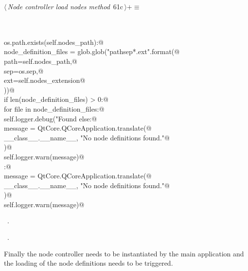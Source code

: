 \documentclass[
    a4paper,      %
    10pt,         %
    openright,    %
    notitlepage,  %
    parskip=half, %
]{scrreprt}       %
\theoremstyle{definition}                    %
\begin{document}
\begin{flushleft} \small
\begin{minipage}{\linewidth}\label{scrap105}\raggedright\small
{} $\langle\,${\itshape Node controller load nodes method}\nobreak\ {\footnotesize {61c}}$\,\rangle+\equiv$
\vspace{-1ex}
\begin{list}{}{} \item
\mbox{}\lstinline@@\\
\mbox{}\lstinline@@\\
\mbox{}\lstinline@if os.path.exists(self.nodes_path):@\\
\mbox{}\lstinline@    node_definition_files = glob.glob("{path}{sep}*.{ext}".format(@\\
\mbox{}\lstinline@        path=self.nodes_path,@\\
\mbox{}\lstinline@        sep=os.sep,@\\
\mbox{}\lstinline@        ext=self.nodes_extension@\\
\mbox{}\lstinline@    ))@\\
\mbox{}\lstinline@    if len(node_definition_files) > 0:@\\
\mbox{}\lstinline@        for file in node_definition_files:@\\
\mbox{}\lstinline@            self.logger.debug("Found %s, would load now", file)@\\
\mbox{}\lstinline@    else:@\\
\mbox{}\lstinline@        message = QtCore.QCoreApplication.translate(@\\
\mbox{}\lstinline@            __class__.__name__, "No node definitions found."@\\
\mbox{}\lstinline@        )@\\
\mbox{}\lstinline@        self.logger.warn(message)@\\
\mbox{}\lstinline@else:@\\
\mbox{}\lstinline@    message = QtCore.QCoreApplication.translate(@\\
\mbox{}\lstinline@        __class__.__name__, "No node definitions found."@\\
\mbox{}\lstinline@    )@\\
\mbox{}\lstinline@    self.logger.warn(message)@\\
\mbox{}\lstinline@@{\NWsep}
\end{list}
\vspace{-1.5ex}
\footnotesize
\begin{list}{}{\setlength{\itemsep}{-\parsep}\setlength{\itemindent}{-\leftmargin}}
\item \NWtxtMacroDefBy\ .
\item \NWtxtMacroRefIn\ .

\item{}
\end{list}
\end{minipage}\vspace{4ex}
\end{flushleft}
Finally the node controller needs to be instantiated by the main application
and the loading of the node definitions needs to be triggered.
\end{document}
